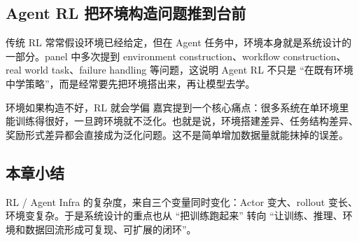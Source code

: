 \subsection{Agent RL 把环境构造问题推到台前}
传统 RL 常常假设环境已经给定，但在 Agent 任务中，环境本身就是系统设计的一部分。panel 中多次提到 environment construction、workflow construction、real world task、failure handling 等问题，这说明 Agent RL 不只是 ``在既有环境中学策略''，而是经常要先把环境搭出来，再让模型去学。

\begin{warningbox}{环境如果构造不好，RL 就会学偏}
嘉宾提到一个核心痛点：很多系统在单环境里能训练得很好，一旦跨环境就不泛化。也就是说，环境搭建差异、任务结构差异、奖励形式差异都会直接成为泛化问题。这不是简单增加数据量就能抹掉的误差。
\end{warningbox}

\subsection{本章小结}
RL / Agent Infra 的复杂度，来自三个变量同时变化：Actor 变大、rollout 变长、环境变复杂。于是系统设计的重点也从 ``把训练跑起来'' 转向 ``让训练、推理、环境和数据回流形成可复现、可扩展的闭环''。

